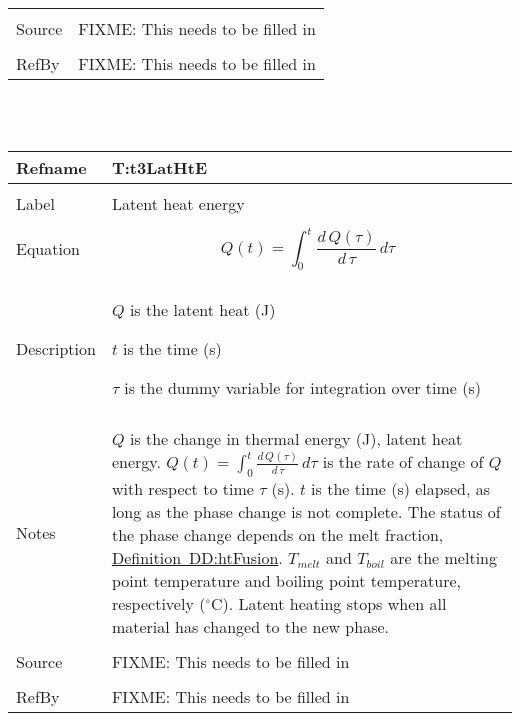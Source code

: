 \documentclass[12pt]{article}
\begin{document}
\begin{minipage}{\textwidth}
\begin{tabular}{p{} p{}}
\\ \midrule \\
Source & FIXME: This needs to be filled in
\\ \midrule \\
RefBy & FIXME: This needs to be filled in
\\ \bottomrule \end{tabular}
\end{minipage}\\
~\newline
\noindent \begin{minipage}{\textwidth}
\begin{tabular}{p{} p{}}
\toprule \textbf{Refname} & \textbf{T:t3LatHtE}
\label{T:t3LatHtE}
\\ \midrule \\
Label & Latent heat energy
\\ \midrule \\
Equation & \begin{dmath}
           Q\left(t\right)=\int_{0}^{t}{\frac{d\,Q\left(τ\right)}{d\,τ}}\,dτ
           \end{dmath}
\\ \midrule \\
Description & \begin{symbDescription}
              \item{$Q$ is the latent heat (J)}
              \item{$t$ is the time (s)}
              \item{$τ$ is the dummy variable for integration over time (s)}
              \end{symbDescription}
\\ \midrule \\
Notes & $Q$ is the change in thermal energy (J), latent heat energy. $Q\left(t\right)=\int_{0}^{t}{\frac{d\,Q\left(τ\right)}{d\,τ}}\,dτ$ is the rate of change of $Q$ with respect to time $τ$ (s). $t$ is the time (s) elapsed, as long as the phase change is not complete. The status of the phase change depends on the melt fraction, \hyperref[DD:htFusion]{Definition~DD:htFusion}. ${T_{melt}}$ and ${T_{boil}}$ are the melting point temperature and boiling point temperature, respectively (${}^{\circ}$C). Latent heating stops when all material has changed to the new phase.
\\ \midrule \\
Source & FIXME: This needs to be filled in
\\ \midrule \\
RefBy & FIXME: This needs to be filled in
\\ \bottomrule \end{tabular}
\end{minipage}\\
\end{document}
